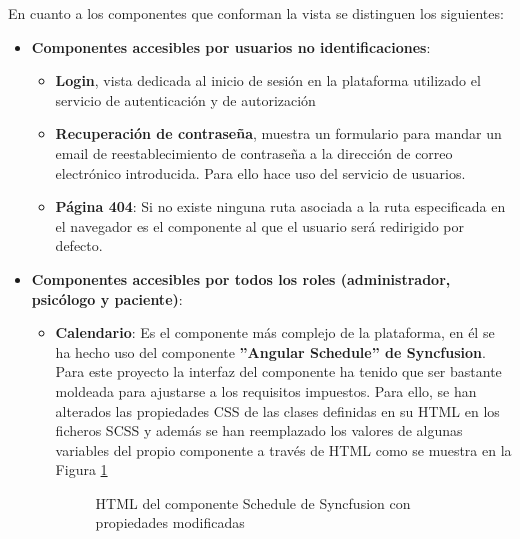 En cuanto a los componentes que conforman la vista se distinguen los siguientes:

\begin{itemize}
    \item \textbf{Componentes accesibles por usuarios no identificaciones}:
    \begin{itemize}
        \item \textbf{Login}, vista dedicada al inicio de sesión en la plataforma utilizado el servicio de autenticación y de autorización
        \item \textbf{Recuperación de contraseña}, muestra un formulario para mandar un email de reestablecimiento de contraseña a la dirección de correo electrónico introducida. Para ello hace uso del servicio de usuarios.
        \item \textbf{Página 404}: Si no existe ninguna ruta asociada a la ruta especificada en el navegador es el componente al que el usuario será redirigido por defecto.
    \end{itemize}
    \item \textbf{Componentes accesibles por todos los roles (administrador, psicólogo y paciente)}:
    \begin{itemize}
        \item \textbf{Calendario}: Es el componente más complejo de la plataforma, en él se ha hecho uso del componente \textbf{''Angular Schedule'' de Syncfusion}. Para este proyecto la interfaz del componente ha tenido que ser bastante moldeada para ajustarse a los requisitos impuestos. Para ello, se han alterados las propiedades CSS de las clases definidas en su HTML en los ficheros SCSS y además se han reemplazado los valores de algunas variables del propio componente a través de HTML como se muestra en la Figura \ref{fig:html-calendar}
        \begin{figure}[H]
            \caption{HTML del componente Schedule de Syncfusion con propiedades modificadas}
            \label{fig:html-calendar}
        \end{figure}

\end{itemize}
\end{itemize}
